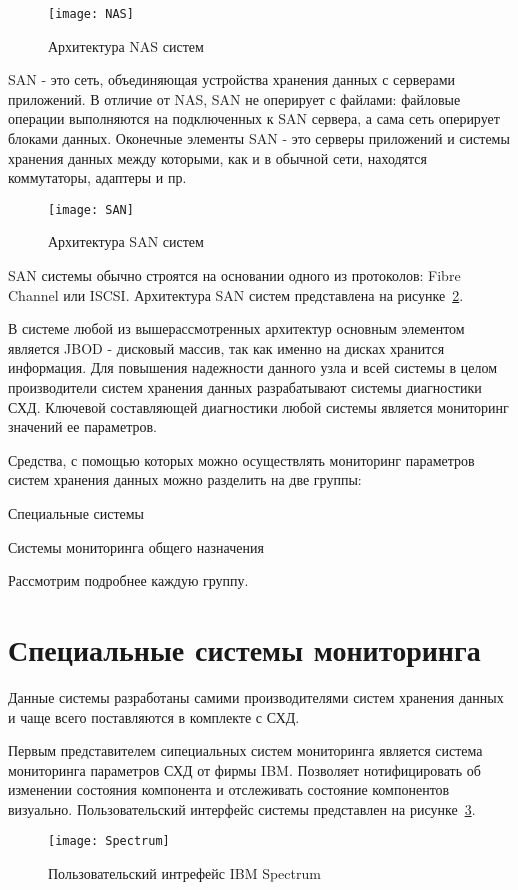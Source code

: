 \begin{figure}[!h]
	\centering
	\texttt{[image: NAS]}
	\caption{Архитектура NAS систем}
	\label{fig:NAS}
\end{figure}
  
SAN - это сеть, объединяющая устройства хранения данных с серверами приложений. В отличие от NAS, SAN не оперирует с файлами: файловые операции выполняются на подключенных к SAN сервера, а сама сеть оперирует блоками данных. Оконечные элементы SAN - это серверы приложений и системы хранения данных между которыми, как и в обычной сети, находятся коммутаторы, адаптеры и пр.

\begin{figure}[!h]
	\centering
	\texttt{[image: SAN]}
	\caption{Архитектура SAN систем}
	\label{fig:SAN}
\end{figure}

SAN системы обычно строятся на основании одного из протоколов: Fibre Channel или ISCSI. Архитектура SAN систем представлена на рисунке~\ref{fig:SAN}.

В системе любой из вышерассмотренных архитектур основным элементом является JBOD - дисковый массив, так как именно на дисках хранится информация. Для повышения надежности данного узла и всей системы в целом производители систем хранения данных разрабатывают системы диагностики СХД. Ключевой составляющей диагностики любой системы является мониторинг значений ее параметров. 

Средства, с помощью которых можно осуществлять мониторинг параметров систем хранения данных можно разделить на две группы:
\begin{itemize*}
	\item{Специальные системы}
	\item{Системы мониторинга общего назначения}
\end{itemize*}
Рассмотрим подробнее каждую группу.
 
\section{Специальные системы мониторинга}
Данные системы разработаны самими  производителями систем хранения данных и чаще всего поставляются в комплекте с СХД.

Первым представителем сипециальных систем мониторинга является система мониторинга параметров СХД от фирмы IBM. Позволяет нотифицировать об изменении состояния компонента и отслеживать состояние компонентов визуально. Пользовательский интерфейс системы представлен на рисунке~\ref{fig:Spectrum}.
\begin{figure}[!h]
	\centering
	\texttt{[image: Spectrum]}
	\caption{Пользовательский интрефейс IBM Spectrum}
	\label{fig:Spectrum}
\end{figure}

